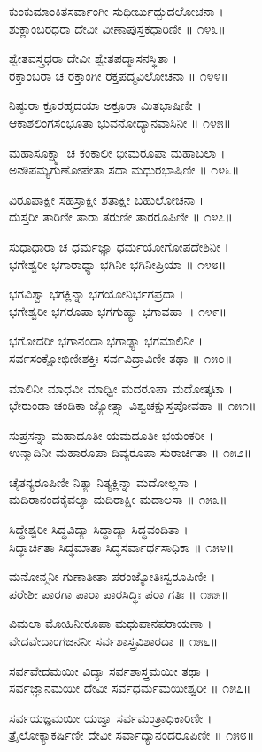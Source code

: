 ಕುಂಕುಮಾಂಕಿತಸರ್ವಾಂಗೀ ಸುಧೀರ್ಬುದ್ಬುದಲೋಚನಾ ।\\
ಶುಕ್ಲಾಂಬರಧರಾ ದೇವೀ ವೀಣಾಪುಸ್ತಕಧಾರಿಣೀ ॥ ೧೪೩॥

ಶ್ವೇತವಸ್ತ್ರಧರಾ ದೇವೀ ಶ್ವೇತಪದ್ಮಾಸನಸ್ಥಿತಾ ।\\
ರಕ್ತಾಂಬರಾ ಚ ರಕ್ತಾಂಗೀ ರಕ್ತಪದ್ಮವಿಲೋಚನಾ ॥ ೧೪೪॥

ನಿಷ್ಠುರಾ ಕ್ರೂರಹೃದಯಾ ಅಕ್ರೂರಾ ಮಿತಭಾಷಿಣೀ ।\\
ಆಕಾಶಲಿಂಗಸಂಭೂತಾ ಭುವನೋದ್ಯಾನವಾಸಿನೀ ॥ ೧೪೫॥

ಮಹಾಸೂಕ್ಷ್ಮಾ ಚ ಕಂಕಾಲೀ ಭೀಮರೂಪಾ ಮಹಾಬಲಾ ।\\
ಅನೌಪಮ್ಯಗುಣೋಪೇತಾ ಸದಾ ಮಧುರಭಾಷಿಣೀ ॥ ೧೪೬॥

ವಿರೂಪಾಕ್ಷೀ ಸಹಸ್ರಾಕ್ಷೀ ಶತಾಕ್ಷೀ ಬಹುಲೋಚನಾ ।\\
ದುಸ್ತರೀ ತಾರಿಣೀ ತಾರಾ ತರುಣೀ ತಾರರೂಪಿಣೀ ॥ ೧೪೭॥

ಸುಧಾಧಾರಾ ಚ ಧರ್ಮಜ್ಞಾ ಧರ್ಮಯೋಗೋಪದೇಶಿನೀ ।\\
ಭಗೇಶ್ವರೀ ಭಗಾರಾಧ್ಯಾ ಭಗಿನೀ ಭಗಿನೀಪ್ರಿಯಾ ॥ ೧೪೮॥

ಭಗವಿಶ್ವಾ ಭಗಕ್ಲಿನ್ನಾ ಭಗಯೋನಿರ್ಭಗಪ್ರದಾ ।\\
ಭಗೇಶ್ವರೀ ಭಗರೂಪಾ ಭಗಗುಹ್ಯಾ ಭಗಾವಹಾ ॥ ೧೪೯॥

ಭಗೋದರೀ ಭಗಾನಂದಾ ಭಗಾಢ್ಯಾ ಭಗಮಾಲಿನೀ ।\\
ಸರ್ವಸಂಕ್ಷೋಭಿಣೀಶಕ್ತಿಃ ಸರ್ವವಿದ್ರಾವಿಣೀ ತಥಾ ॥ ೧೫೦॥

ಮಾಲಿನೀ ಮಾಧವೀ ಮಾಧ್ವೀ ಮದರೂಪಾ ಮದೋತ್ಕಟಾ ।\\
ಭೇರುಂಡಾ ಚಂಡಿಕಾ ಜ್ಯೋತ್ಸ್ನಾ ವಿಶ್ವಚಕ್ಷುಸ್ತಪೋವಹಾ ॥ ೧೫೧॥

ಸುಪ್ರಸನ್ನಾ ಮಹಾದೂತೀ ಯಮದೂತೀ ಭಯಂಕರೀ ।\\
ಉನ್ಮಾದಿನೀ ಮಹಾರೂಪಾ ದಿವ್ಯರೂಪಾ ಸುರಾರ್ಚಿತಾ ॥ ೧೫೨॥

ಚೈತನ್ಯರೂಪಿಣೀ ನಿತ್ಯಾ ನಿತ್ಯಕ್ಲಿನ್ನಾ ಮದೋಲ್ಲಸಾ ।\\
ಮದಿರಾನಂದಕೈವಲ್ಯಾ ಮದಿರಾಕ್ಷೀ ಮದಾಲಸಾ ॥ ೧೫೩॥

ಸಿದ್ಧೇಶ್ವರೀ ಸಿದ್ಧವಿದ್ಯಾ ಸಿದ್ಧಾದ್ಯಾ ಸಿದ್ಧವಂದಿತಾ ।\\
ಸಿದ್ಧಾರ್ಚಿತಾ ಸಿದ್ಧಮಾತಾ ಸಿದ್ಧಸರ್ವಾರ್ಥಸಾಧಿಕಾ ॥ ೧೫೪॥

ಮನೋನ್ಮನೀ ಗುಣಾತೀತಾ ಪರಂಜ್ಯೋತಿಃಸ್ವರೂಪಿಣೀ ।\\
ಪರೇಶೀ ಪಾರಗಾ ಪಾರಾ ಪಾರಸಿದ್ಧಿಃ ಪರಾ ಗತಿಃ ॥ ೧೫೫॥

ವಿಮಲಾ ಮೋಹಿನೀರೂಪಾ ಮಧುಪಾನಪರಾಯಣಾ ।\\
ವೇದವೇದಾಂಗಜನನೀ ಸರ್ವಶಾಸ್ತ್ರವಿಶಾರದಾ ॥ ೧೫೬॥

ಸರ್ವವೇದಮಯೀ ವಿದ್ಯಾ ಸರ್ವಶಾಸ್ತ್ರಮಯೀ ತಥಾ ।\\
ಸರ್ವಜ್ಞಾನಮಯೀ ದೇವೀ ಸರ್ವಧರ್ಮಮಯೀಶ್ವರೀ ॥ ೧೫೭॥

ಸರ್ವಯಜ್ಞಮಯೀ ಯಜ್ವಾ ಸರ್ವಮಂತ್ರಾಧಿಕಾರಿಣೀ ।\\
ತ್ರೈಲೋಕ್ಯಾಕರ್ಷಿಣೀ ದೇವೀ ಸರ್ವಾದ್ಯಾನಂದರೂಪಿಣೀ ॥ ೧೫೮॥

